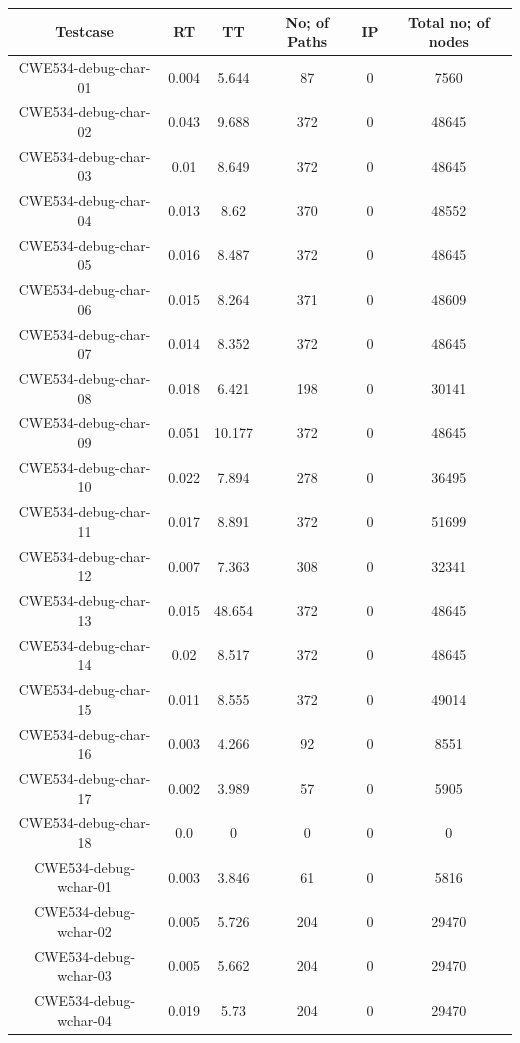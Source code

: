 \begin{table}[h!]
\centering
 \begin{tabular}{||c |c |c |c |c| c||} 
 \hline
 \textbf{Testcase} & \textbf{RT} & \textbf{TT} & \textbf{No; of Paths} & \textbf{IP}& \textbf{Total no; of nodes} \\ [0.5ex] 
 \hline\hline
 CWE534-debug-char-01 & 0.004 & 5.644 & 87 & 0& 7560\\ 
 \hline
CWE534-debug-char-02 & 0.043 &  9.688 & 372&0& 48645\\ 
 \hline
 CWE534-debug-char-03 & 0.01& 8.649 & 372&0& 48645\\ 
 \hline
 CWE534-debug-char-04 & 0.013 & 8.62 & 370&0& 48552\\ 
 \hline
 CWE534-debug-char-05 & 0.016 & 8.487 & 372&0& 48645\\ 
 \hline
 CWE534-debug-char-06 & 0.015 & 8.264& 371&0& 48609\\ 
 \hline
 CWE534-debug-char-07 & 0.014 & 8.352 & 372&0& 48645\\ 
 \hline
 CWE534-debug-char-08 & 0.018 &6.421 & 198&0& 30141\\ 
 \hline
 CWE534-debug-char-09 & 0.051 &10.177 &372&0& 48645\\ 
 \hline
 CWE534-debug-char-10 & 0.022 & 7.894& 278&0&36495 \\ 
 \hline
 CWE534-debug-char-11 & 0.017 &8.891& 372&0&51699 \\ 
 \hline
 CWE534-debug-char-12 & 0.007 & 7.363 &308&0& 32341\\ 
 \hline
 CWE534-debug-char-13 & 0.015 &48.654 & 372&0& 48645\\ 
 \hline
 CWE534-debug-char-14 & 0.02 & 8.517 & 372&0& 48645\\ 
 \hline
 CWE534-debug-char-15 & 0.011 & 8.555 & 372&0&49014\\ 
 \hline
  CWE534-debug-char-16 & 0.003 &4.266 & 92&0& 8551\\ 
 \hline
  CWE534-debug-char-17 & 0.002 & 3.989 & 57&0& 5905\\ 
 \hline
  CWE534-debug-char-18 & 0.0 & 0 & 0&0& 0\\ 
  \hline
  CWE534-debug-wchar-01 & 0.003 &3.846 &61 & 0& 5816\\ 
 \hline
CWE534-debug-wchar-02 & 0.005 & 5.726 & 204&0& 29470\\ 
 \hline
 CWE534-debug-wchar-03 & 0.005 &5.662 & 204&0& 29470\\ 
 \hline
 CWE534-debug-wchar-04 & 0.019 & 5.73 & 204&0& 29470\\ 
 \hline

\end{tabular}
\end{table}

